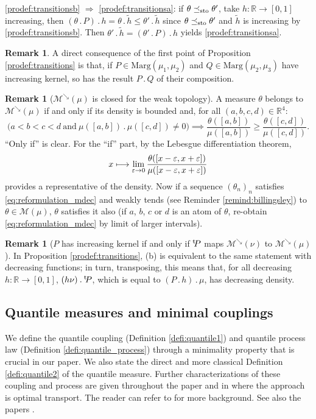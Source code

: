 \documentclass[10pt,a4paper]{article}
\newcommand{\ldot}{\mathbin{.}}
\newcommand\mto{\mathchoice{\longmapsto}{\mapsto}{\mapsto}{\mapsto}}
\theoremstyle{plain}
\theoremstyle{definition}
\newtheorem{rem}[them]{Remark}
\newcommand{\trans}{{}^{\mathrm{t}}\mkern-1mu}
\let\eps\varepsilon
\newcommand{\m}{\mathcal{M}}
\newcommand{\ma}{\mathrm{Marg}}
\newcommand{\R}{\mathbb{R}}
\newcommand{\leqs}{\preceq_{\text{\rm sto}}}
\newcommand{\mdec}{\mathcal{M}^{\scriptscriptstyle\searrow}}
\begin{document}
\eqref{prodef:transitionsb} $\Rightarrow$ \eqref{prodef:transitionsa}: if $\theta\leqs \theta'$, take $h:\R\to[0,1]$ increasing, then $(\theta \ldot P)\ldot h= \theta \ldot\tilde h\leq \theta' \ldot\tilde h$ since $\theta\leqs \theta'$ and $\tilde h$ is increasing by \eqref{prodef:transitionsb}. Then $\theta'\ldot\tilde h=(\theta'\ldot P)\ldot h$ yields \eqref{prodef:transitionsa}.

\begin{rem}\label{rem:transitions_croissantes_composee} A direct consequence of the first point of Proposition \ref{prodef:transitions} is that, if $P\in\ma(\mu_1,\mu_2)$ and $Q\in\ma(\mu_2,\mu_3)$ have increasing kernel, so has the result $P\ldot Q$ of their composition.
\end{rem}

\begin{rem}[$\mdec(\mu)$ is closed for the weak topology]\label{rem:mdec} A measure $\theta$ belongs to $\mdec(\mu)$ if and only if its density is bounded and, for all $(a,b,c,d)\in\R^4$:
\begin{equation}\label{eq:reformulation_mdec}
\bigl(a<b<c<d\ \text{and}\ \mu([a,b])\ldot\mu([c,d])\neq0\bigr)\implies \frac{\theta([a,b])}{\mu([a,b])}\geqslant \frac{\theta([c,d])}{\mu([c,d])}.
\end{equation}
``Only if'' is clear. For the ``if'' part, by the Lebesgue differentiation theorem,
\[
x\mto\lim_{\eps\to0}\frac{\theta([x-\varepsilon,x+\varepsilon])}{\mu([x-\varepsilon,x+\varepsilon])}
\]
provides a representative of the density. Now if a sequence $(\theta_n)_n$ satisfies \eqref{eq:reformulation_mdec} and weakly tends (see Reminder \ref{remind:billingsley}) to $\theta\in\m(\mu)$, $\theta$ satisfies it also (if $a$, $b$, $c$ or $d$ is an atom of $\theta$, re-obtain \eqref{eq:reformulation_mdec} by limit of larger intervals).
\end{rem}

\begin{rem}[$P$ has increasing kernel if and only if $\trans\!P$ maps $\mdec(\nu)$ to $\mdec(\mu)$]\label{rem:stable}
In Proposition \ref{prodef:transitions}, (b) is equivalent to the same statement with decreasing functions; in turn, transposing, this means that, for all decreasing $h:\R\to[0,1]$, $(h\nu)\ldot\trans\!P$, which is equal to $(P\ldot h)\ldot\mu$, has decreasing density.
\end{rem}

\subsection{Quantile measures and minimal couplings}\label{ss:minimality}
We define the quantile coupling (Definition \ref{defi:quantile1}) and quantile process law (Definition \ref{defi:quantile_process}) through a minimality property that is crucial in our paper. We also state the direct and more classical Definition \ref{defi:quantile2} of the quantile measure. Further characterizations of these coupling and process are given throughout the paper and in \cite{BouJui2} where the approach is optimal transport. The reader can refer to \cite{RR, Vi1} for more background. See also the papers \cite{Ju_seminaire, Pass}.
\end{document}
